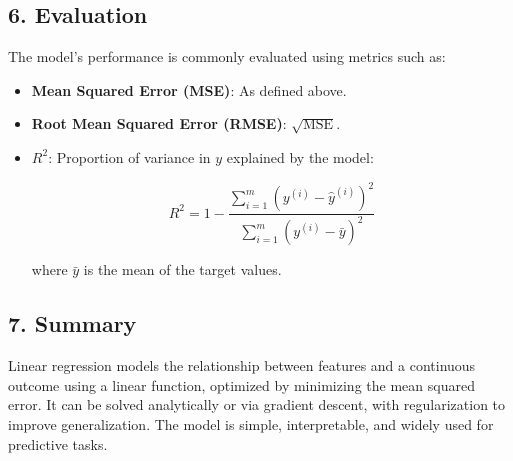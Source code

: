 \documentclass[a4paper,12pt]{article}
\begin{document}
\subsection*{6. Evaluation}
The model’s performance is commonly evaluated using metrics such as:
\begin{itemize}
    \item \textbf{Mean Squared Error (MSE)}: As defined above.
    \item \textbf{Root Mean Squared Error (RMSE)}: $\sqrt{\text{MSE}}$.
    \item \textbf{$R^2$}: Proportion of variance in $y$ explained by the model:

    \[
    R^2 = 1 - \frac{\sum_{i=1}^m (y^{(i)} - \hat{y}^{(i)})^2}{\sum_{i=1}^m (y^{(i)} - \bar{y})^2}
    \]

    where $\bar{y}$ is the mean of the target values.
\end{itemize}

\subsection*{7. Summary}
Linear regression models the relationship between features and a continuous outcome using a linear function, optimized by minimizing the mean squared error. It can be solved analytically or via gradient descent, with regularization to improve generalization. The model is simple, interpretable, and widely used for predictive tasks.
\end{document}
